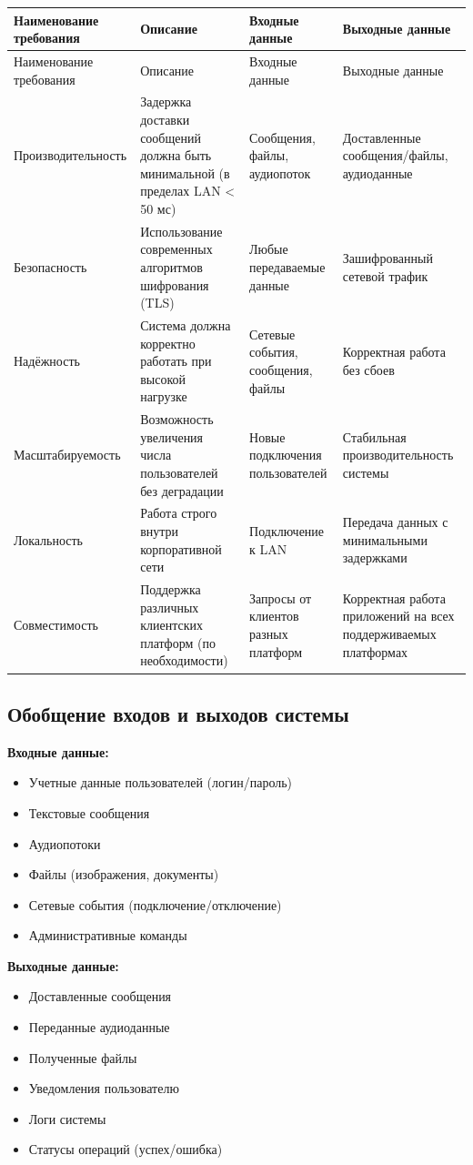 \documentclass[14pt,a4paper]{extarticle}
\begin{document}
\begin{longtable}{|p{4cm}|p{5cm}|p{3cm}|p{3cm}|}
\hline
Наименование требования & Описание & Входные данные & Выходные данные \\
\hline
\endfirsthead
\hline
Наименование требования & Описание & Входные данные & Выходные данные \\
\hline
\endhead

Производительность & Задержка доставки сообщений должна быть минимальной (в пределах LAN < 50 мс) & Сообщения, файлы, аудиопоток & Доставленные сообщения/файлы, аудиоданные \\
\hline
Безопасность & Использование современных алгоритмов шифрования (TLS) & Любые передаваемые данные & Зашифрованный сетевой трафик \\
\hline
Надёжность & Система должна корректно работать при высокой нагрузке & Сетевые события, сообщения, файлы & Корректная работа без сбоев \\
\hline
Масштабируемость & Возможность увеличения числа пользователей без деградации & Новые подключения пользователей & Стабильная производительность системы \\
\hline
Локальность & Работа строго внутри корпоративной сети & Подключение к LAN & Передача данных с минимальными задержками \\
\hline
Совместимость & Поддержка различных клиентских платформ (по необходимости) & Запросы от клиентов разных платформ & Корректная работа приложений на всех поддерживаемых платформах \\
\hline
\end{longtable}

\subsection{Обобщение входов и выходов системы}

\textbf{Входные данные:}
\begin{itemize}
    \item Учетные данные пользователей (логин/пароль)
    \item Текстовые сообщения
    \item Аудиопотоки
    \item Файлы (изображения, документы)
    \item Сетевые события (подключение/отключение)
    \item Административные команды
\end{itemize}

\textbf{Выходные данные:}
\begin{itemize}
    \item Доставленные сообщения
    \item Переданные аудиоданные
    \item Полученные файлы
    \item Уведомления пользователю
    \item Логи системы
    \item Статусы операций (успех/ошибка)
\end{itemize}
\end{document}
